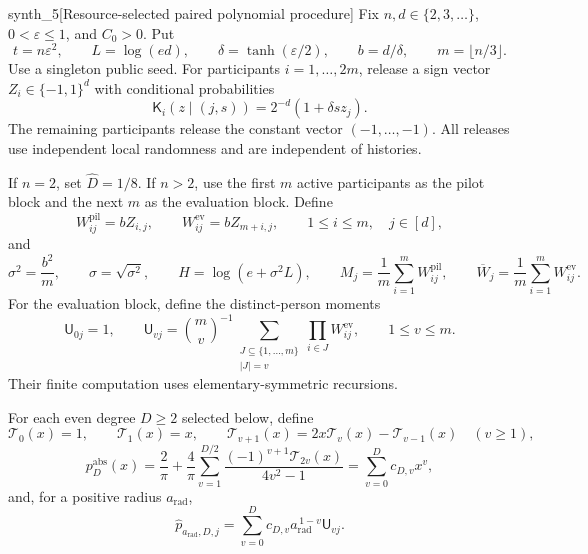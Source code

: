 \begin{definitionv}{synth_5}[Resource-selected paired polynomial procedure]
Fix \(n,d\in\{2,3,\ldots\}\), \(0<\varepsilon\le1\), and \(C_0>0\). Put
\[
t=n\varepsilon^2,\qquad L=\log(ed),\qquad
\delta=\tanh(\varepsilon/2),\qquad b=d/\delta,
\qquad m=\lfloor n/3\rfloor.
\]
Use a singleton public seed. For participants \(i=1,\ldots,2m\), release a sign vector \(Z_i\in\{-1,1\}^d\) with conditional probabilities
\[
\mathsf K_i(z\mid(j,s))
=2^{-d}(1+\delta s z_j).
\]
The remaining participants release the constant vector \((-1,\ldots,-1)\). All releases use independent local randomness and are independent of histories.

If \(n=2\), set \(\widehat D=1/8\). If \(n>2\), use the first \(m\) active participants as the pilot block and the next \(m\) as the evaluation block. Define
\[
W^{\mathrm{pil}}_{ij}=bZ_{i,j},
\qquad
W^{\mathrm{ev}}_{ij}=bZ_{m+i,j},
\qquad 1\le i\le m,\quad j\in[d],
\]
and
\[
\sigma^2=\frac{b^2}{m},\qquad
\sigma=\sqrt{\sigma^2},\qquad
H=\log(e+\sigma^2L),\qquad
M_j=\frac1m\sum_{i=1}^mW^{\mathrm{pil}}_{ij},
\qquad
\overline W_j=\frac1m\sum_{i=1}^mW^{\mathrm{ev}}_{ij}.
\]
For the evaluation block, define the distinct-person moments
\[
\mathsf U_{0j}=1,\qquad
\mathsf U_{vj}
=\binom mv^{-1}
\sum_{\substack{J\subseteq\{1,\ldots,m\}\\ |J|=v}}
\prod_{i\in J}W^{\mathrm{ev}}_{ij},
\qquad 1\le v\le m.
\]
Their finite computation uses elementary-symmetric recursions.

For each even degree \(D\ge2\) selected below, define
\[
\mathcal T_0(x)=1,\qquad
\mathcal T_1(x)=x,\qquad
\mathcal T_{v+1}(x)=2x\mathcal T_v(x)-\mathcal T_{v-1}(x)
\quad(v\ge1),
\]
\[
p_D^{\mathrm{abs}}(x)
=\frac2\pi+\frac4\pi
\sum_{v=1}^{D/2}
\frac{(-1)^{v+1}\mathcal T_{2v}(x)}{4v^2-1}
=\sum_{v=0}^Dc_{D,v}x^v,
\]
and, for a positive radius \(a_{\mathrm{rad}}\),
\[
\widehat p_{a_{\mathrm{rad}},D,j}
=\sum_{v=0}^D
c_{D,v}a_{\mathrm{rad}}^{\,1-v}\mathsf U_{vj}.
\]


\end{definitionv}
